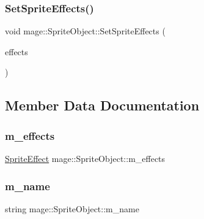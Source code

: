 \hypertarget{classmage_1_1_sprite_object_ad2eb556b5965d894e81cca96c5c0540b}{}\label{classmage_1_1_sprite_object_ad2eb556b5965d894e81cca96c5c0540b} 
\subsubsection{\texorpdfstring{Set\+Sprite\+Effects()}{SetSpriteEffects()}}
{\footnotesize\ttfamily void mage\+::\+Sprite\+Object\+::\+Set\+Sprite\+Effects (\begin{DoxyParamCaption}\item[{\hyperlink{namespacemage_a9cfe18123066ba4236f548f9de75d881}{Sprite\+Effect}}]{effects }\end{DoxyParamCaption})}



\subsection{Member Data Documentation}
\hypertarget{classmage_1_1_sprite_object_a270f73b8d316f72c4228854d08a6d2ea}{}\label{classmage_1_1_sprite_object_a270f73b8d316f72c4228854d08a6d2ea} 
\subsubsection{\texorpdfstring{m\+\_\+effects}{m\_effects}}
{\footnotesize\ttfamily \hyperlink{namespacemage_a9cfe18123066ba4236f548f9de75d881}{Sprite\+Effect} mage\+::\+Sprite\+Object\+::m\+\_\+effects\hspace{0.3cm}{\ttfamily [private]}}

\hypertarget{classmage_1_1_sprite_object_a6f2a859e40ed391909bb4c87a8b74480}{}\label{classmage_1_1_sprite_object_a6f2a859e40ed391909bb4c87a8b74480} 
\subsubsection{\texorpdfstring{m\+\_\+name}{m\_name}}
{\footnotesize\ttfamily string mage\+::\+Sprite\+Object\+::m\+\_\+name\hspace{0.3cm}{\ttfamily [private]}}

